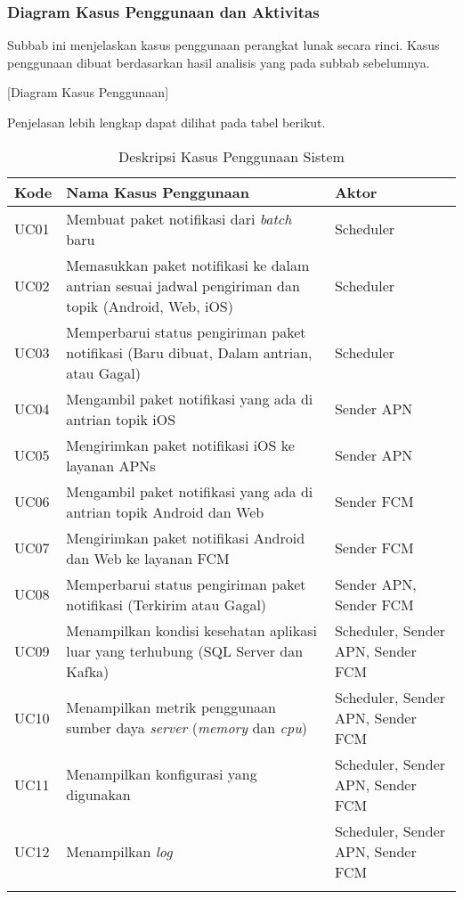         \subsubsection{Diagram Kasus Penggunaan dan Aktivitas}
        Subbab ini menjelaskan kasus penggunaan perangkat lunak secara rinci. Kasus penggunaan dibuat berdasarkan hasil analisis yang pada subbab sebelumnya.
        
        [Diagram Kasus Penggunaan]
        
        Penjelasan lebih lengkap dapat dilihat pada tabel berikut.
        
        \begin{longtable}{|p{1cm}|p{5cm}|p{2cm}|}
            \hline
            \textbf{Kode} & \textbf{Nama Kasus Penggunaan} & \textbf{Aktor}  \\
            \hline
            UC01 & Membuat paket notifikasi dari \textit{batch} baru & Scheduler \\
            \hline
            UC02 & Memasukkan paket notifikasi ke dalam antrian sesuai jadwal pengiriman dan topik (Android, Web, iOS) & Scheduler \\
            \hline
            UC03 & Memperbarui status pengiriman paket notifikasi (Baru dibuat, Dalam antrian, atau Gagal) & Scheduler \\
            \hline
            UC04 & Mengambil paket notifikasi yang ada di antrian topik iOS & Sender APN \\
            \hline
            UC05 & Mengirimkan paket notifikasi iOS ke layanan APNs & Sender APN \\
            \hline
            UC06 & Mengambil paket notifikasi yang ada di antrian topik Android dan Web & Sender FCM \\
            \hline
            UC07 & Mengirimkan paket notifikasi Android dan Web ke layanan FCM & Sender FCM \\
            \hline
            UC08 & Memperbarui status pengiriman paket notifikasi (Terkirim atau Gagal) & Sender APN, Sender FCM \\
            \hline
            UC09 & Menampilkan kondisi kesehatan aplikasi luar yang terhubung (SQL Server dan Kafka) & Scheduler, Sender APN, Sender FCM \\
            \hline
            UC10 & Menampilkan metrik penggunaan sumber daya \textit{server} (\textit{memory} dan \textit{cpu}) & Scheduler, Sender APN, Sender FCM \\
            \hline
            UC11 & Menampilkan konfigurasi yang digunakan & Scheduler, Sender APN, Sender FCM \\
            \hline
            UC12 & Menampilkan \textit{log} & Scheduler, Sender APN, Sender FCM \\
            \hline
            \caption{Deskripsi Kasus Penggunaan Sistem}
        \end{longtable}
        
